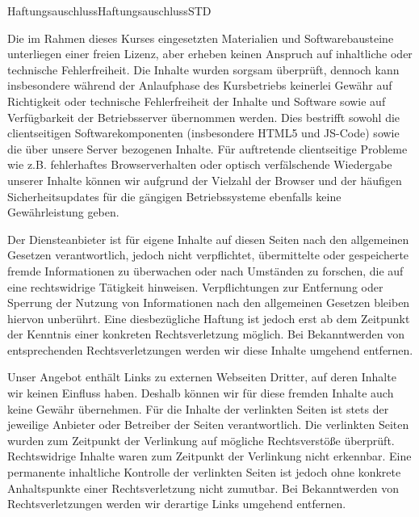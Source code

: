 \begin{MXContent}{Haftungsauschluss}{Haftungsauschluss}{STD}

Die im Rahmen dieses Kurses eingesetzten Materialien und Softwarebausteine unterliegen einer freien Lizenz, aber erheben keinen Anspruch auf inhaltliche oder technische Fehlerfreiheit. Die Inhalte wurden
sorgsam überprüft, dennoch kann insbesondere während der Anlaufphase des Kursbetriebs keinerlei Gewähr auf Richtigkeit oder technische Fehlerfreiheit der Inhalte und Software sowie auf
Verfügbarkeit der Betriebsserver übernommen werden. Dies bestrifft sowohl die clientseitigen Softwarekomponenten (insbesondere HTML5 und JS-Code) sowie die über unsere Server bezogenen Inhalte.
Für auftretende clientseitige Probleme wie z.B. fehlerhaftes Browserverhalten oder optisch verfälschende Wiedergabe unserer Inhalte können wir aufgrund der Vielzahl der Browser und der häufigen
Sicherheitsupdates für die gängigen Betriebssysteme ebenfalls keine Gewährleistung geben.

Der Diensteanbieter ist für eigene Inhalte auf diesen Seiten nach den allgemeinen Gesetzen verantwortlich,
jedoch nicht verpflichtet, übermittelte oder gespeicherte fremde Informationen zu überwachen oder nach Umständen zu forschen,
die auf eine rechtswidrige Tätigkeit hinweisen. Verpflichtungen zur Entfernung oder Sperrung der Nutzung von Informationen nach den allgemeinen Gesetzen bleiben hiervon unberührt.
Eine diesbezügliche Haftung ist jedoch erst ab dem Zeitpunkt der Kenntnis einer konkreten Rechtsverletzung möglich. Bei Bekanntwerden von entsprechenden Rechtsverletzungen werden wir diese Inhalte umgehend entfernen.

Unser Angebot enthält Links zu externen Webseiten Dritter, auf deren Inhalte wir keinen Einfluss haben. Deshalb können wir für diese fremden Inhalte auch keine Gewähr übernehmen.
Für die Inhalte der verlinkten Seiten ist stets der jeweilige Anbieter oder Betreiber der Seiten verantwortlich. Die verlinkten Seiten wurden zum Zeitpunkt der Verlinkung
auf mögliche Rechtsverstöße überprüft. Rechtswidrige Inhalte waren zum Zeitpunkt der Verlinkung nicht erkennbar. Eine permanente inhaltliche Kontrolle der verlinkten Seiten ist jedoch ohne
konkrete Anhaltspunkte einer Rechtsverletzung nicht zumutbar. Bei Bekanntwerden von Rechtsverletzungen werden wir derartige Links umgehend entfernen.


\end{MXContent}
